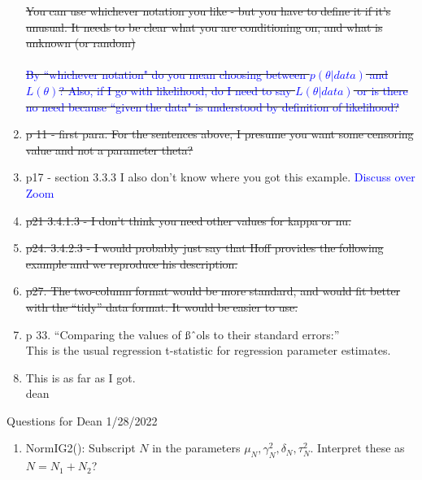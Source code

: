 \documentclass[12pt, a4paper]{article}
\begin{document}
\begin{enumerate}
    \sout{You can use whichever notation you like - but you have to define it if it’s unusual.  It needs to be clear what you are conditioning on, and what is unknown (or random)}\\\\
    \sout{\textcolor{blue}{By ``whichever notation" do you mean choosing between $p(\theta|data)$ and $L(\theta)$?  Also, if I go with likelihood, do I need to say $L(\theta|data)$ or is there no need because ``given the data" is understood by definition of likelihood?}}
  \item \sout{p 11 - first para.  For the sentences above, I presume you want some censoring value and not a parameter theta?}
  \item p17 - section 3.3.3  I also don't know where you got this example. \textcolor{blue}{Discuss over Zoom}
  \item \sout{p21 3.4.1.3 - I don't think you need other values for kappa or nu.}
  \item \sout{p24. 3.4.2.3 - I would probably just say that Hoff provides the following example and we reproduce his description.}
  \item \sout{p27. The two-column format would be more standard, and would fit better with the “tidy” data format.  It would be easier to use.}
  \item p 33.  ``Comparing the values of ßˆols to their standard errors:”\\
    This is the usual regression t-statistic for regression parameter estimates.
  \item This is as far as I got.\\
    dean

\end{enumerate}

{\huge Questions for Dean 1/28/2022}
\begin{enumerate}
  \item NormIG2():  Subscript $N$ in the parameters $\mu_N,\gamma^2_N,\delta_N,\tau^2_N$. Interpret these as $N = N_1 + N_2$?
\end{enumerate}
\end{document}
